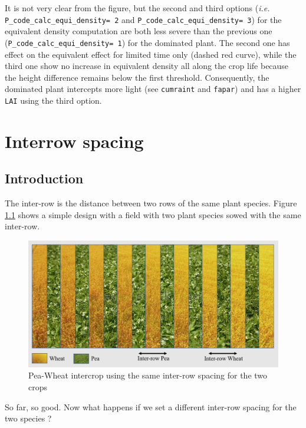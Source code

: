 \documentclass[]{book}
\begin{document}
It is not very clear from the figure, but the second and third options (\emph{i.e.} \texttt{P\_code\_calc\_equi\_density=\ 2} and \texttt{P\_code\_calc\_equi\_density=\ 3}) for the equivalent density computation are both less severe than the previous one (\texttt{P\_code\_calc\_equi\_density=\ 1}) for the dominated plant. The second one has effect on the equivalent effect for limited time only (dashed red curve), while the third one show no increase in equivalent density all along the crop life because the height difference remains below the first threshold. Consequently, the dominated plant intercepts more light (see \texttt{cumraint} and \texttt{fapar}) and has a higher \texttt{LAI} using the third option.

\hypertarget{Interrow}{%
\chapter{Interrow spacing}\label{Interrow}}

\hypertarget{introduction-3}{%
\section{Introduction}\label{introduction-3}}

The inter-row is the distance between two rows of the same plant species. Figure \ref{fig:SameInterrow} shows a simple design with a field with two plant species sowed with the same inter-row.

\begin{figure}
\centering
\includegraphics{img/Same-Interrow.png}
\caption{\label{fig:SameInterrow}Pea-Wheat intercrop using the same inter-row spacing for the two crops}
\end{figure}

So far, so good. Now what happens if we set a different inter-row spacing for the two species ?
\end{document}
